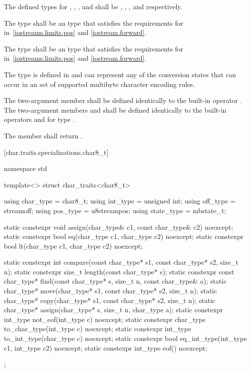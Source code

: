 \pnum
The defined types for
,
,
,
and
shall be
,
,
,
and
respectively.

\pnum
The type
shall be an  type that satisfies the requirements for
in~\ref{iostreams.limits.pos} and \ref{iostream.forward}.

\pnum
The type
shall be an  type that satisfies the requirements for
in~\ref{iostreams.limits.pos} and \ref{iostream.forward}.

\pnum
The type
is defined in
and can represent any of the conversion states that can occur in an
 set of supported multibyte
character encoding rules.

\pnum
The two-argument member  shall be defined identically to the
built-in operator \tcode{=}. The two-argument members 
and  shall be defined identically to the built-in operators
\tcode{==} and \tcode{<} for type .

\pnum
The member
shall return
.

[char.traits.specializations.char8_t]{}

%
\begin{codeblock}
namespace std {
  template<> struct char_traits<char8_t> {
    using char_type = char8_t;
    using int_type = unsigned int;
    using off_type = streamoff;
    using pos_type = u8streampos;
    using state_type = mbstate_t;

    static constexpr void assign(char_type& c1, const char_type& c2) noexcept;
    static constexpr bool eq(char_type c1, char_type c2) noexcept;
    static constexpr bool lt(char_type c1, char_type c2) noexcept;

    static constexpr int compare(const char_type* s1, const char_type* s2, size_t n);
    static constexpr size_t length(const char_type* s);
    static constexpr const char_type* find(const char_type* s, size_t n,
                                           const char_type& a);
    static char_type* move(char_type* s1, const char_type* s2, size_t n);
    static char_type* copy(char_type* s1, const char_type* s2, size_t n);
    static char_type* assign(char_type* s, size_t n, char_type a);
    static constexpr int_type not_eof(int_type c) noexcept;
    static constexpr char_type to_char_type(int_type c) noexcept;
    static constexpr int_type to_int_type(char_type c) noexcept;
    static constexpr bool eq_int_type(int_type c1, int_type c2) noexcept;
    static constexpr int_type eof() noexcept;
  };
}
\end{codeblock}

